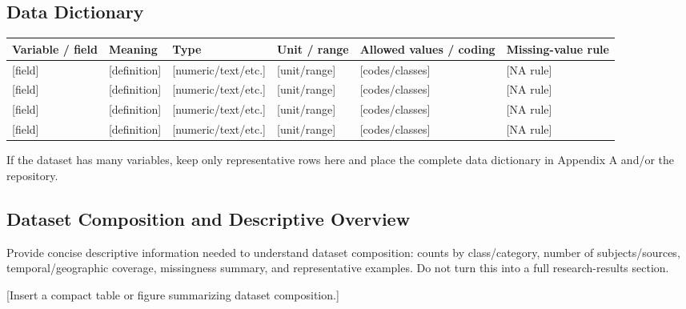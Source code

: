 \documentclass[11pt,a4paper]{article}
\begin{document}
\subsection{Data Dictionary}
\noindent
\begin{tabularx}{\textwidth}{|p{2.2cm}|X|p{2.5cm}|p{2.2cm}|p{2.8cm}|p{2.2cm}|}
\hline
\textbf{Variable / field} & \textbf{Meaning} & \textbf{Type} & \textbf{Unit / range} & \textbf{Allowed values / coding} & \textbf{Missing-value rule} \\
\hline
{[field]} & [definition] & [numeric/text/etc.] & [unit/range] & [codes/classes] & [NA rule] \\
\hline
{[field]} & [definition] & [numeric/text/etc.] & [unit/range] & [codes/classes] & [NA rule] \\
\hline
{[field]} & [definition] & [numeric/text/etc.] & [unit/range] & [codes/classes] & [NA rule] \\
\hline
{[field]} & [definition] & [numeric/text/etc.] & [unit/range] & [codes/classes] & [NA rule] \\
\hline
\end{tabularx}

\vspace{0.5em}
\noindent
{\footnotesize If the dataset has many variables, keep only representative rows here and place the complete data dictionary in Appendix A and/or the repository.}

\subsection{Dataset Composition and Descriptive Overview}
Provide concise descriptive information needed to understand dataset composition: counts by class/category, number of subjects/sources, temporal/geographic coverage, missingness summary, and representative examples. Do not turn this into a full research-results section.

[Insert a compact table or figure summarizing dataset composition.]

\vspace{1.5em}

\end{document}
